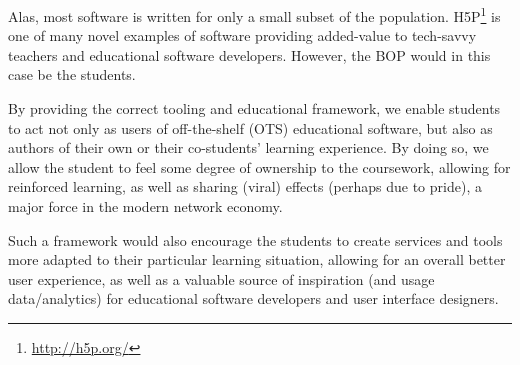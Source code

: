 Alas, most software is written for only a small subset of the population. 
H5P\footnote{\url{http://h5p.org/}} is one of many novel examples of software 
providing added-value to tech-savvy teachers and educational software 
developers. However, the BOP would in this case be the students.

By providing the correct tooling and educational framework, we enable students
to act not only as users of off-the-shelf (OTS) educational software, but
also as authors of their own or their co-students' learning experience. By
doing so, we allow the student to feel some degree of ownership to the
coursework, allowing for reinforced learning, as well as sharing (viral) effects
(perhaps due to pride), a major force in the modern network economy.

Such a framework would also encourage the students to create services and tools
more adapted to their particular learning situation, allowing for an overall
better user experience, as well as a valuable source of inspiration (and usage
data/analytics) for educational software developers and user interface
designers.
